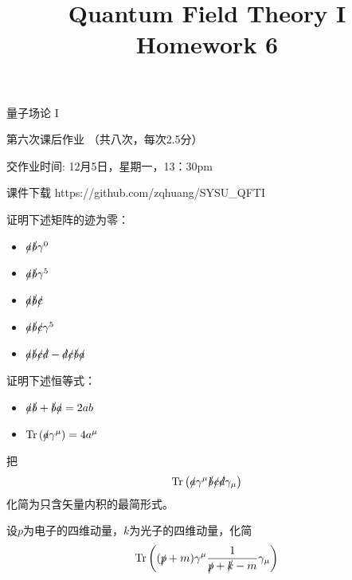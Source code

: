 \documentclass[CJK]{beamer}
\title{Quantum Field Theory I \\ Homework 6}
\author{}
\date{}
\begin{document}
\begin{frame}
 
\begin{center}
\begin{Large}
\bch
量子场论 I 

{\vskip 0.3in}

第六次课后作业 （共八次，每次2.5分）

交作业时间: 12月5日，星期一，13：30pm

\ech
\end{Large}
\end{center}

\vskip 0.2in

\bch
课件下载
\ech
https://github.com/zqhuang/SYSU\_QFTI

\end{frame}

\begin{frame}
\bch
证明下述矩阵的迹为零：
\begin{itemize}
\item{$\slashed{a}\slashed{b}\gamma^0$}
\item{$\slashed{a}\slashed{b}\gamma^5$}
\item{$\slashed{a}\slashed{b}\slashed{c}$}
\item{$\slashed{a}\slashed{b}\slashed{c}\gamma^5$}
\item{$\slashed{a}\slashed{b}\slashed{c}\slashed{d}-\slashed{d}\slashed{c}\slashed{b}\slashed{a}$}
\end{itemize}
\ech
\end{frame}

\begin{frame}
\bch
证明下述恒等式：
\begin{itemize}
\item{$\slashed{a}\slashed{b} + \slashed{b}\slashed{a} = 2 ab$}
\item{$\mathrm{Tr}\left(\slashed{a}\gamma^\mu\right) = 4 a^\mu$}
\end{itemize}
\ech
\end{frame}

\begin{frame}
\bch 
把
$$\mathrm{Tr}\left(\slashed{a}\gamma^\mu\slashed{b}\slashed{c}\slashed{d}\gamma_\mu\right)$$
化简为只含矢量内积的最简形式。

\ech
\end{frame}



\begin{frame}
\bch
设$p$为电子的四维动量，$k$为光子的四维动量，化简
$$\mathrm{Tr}\left( (\slashed{p}+m)\gamma^\mu\frac{1}{\slashed{p}+\slashed{k}-m}\gamma_\mu\right)$$
\ech
\end{frame}
\end{document}

